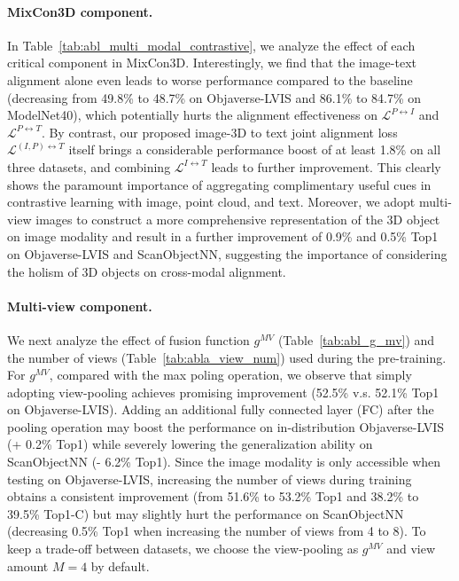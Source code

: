 \documentclass{article} \usepackage{iclr2024_conference,times}
\newcommand{\ourmethod}{MixCon3D}
\begin{document}
\paragraph{MixCon3D component.}
In Table~\ref{tab:abl_multi_modal_contrastive}, we analyze the effect of each critical component in \ourmethod. 
Interestingly, we find that the image-text alignment alone even leads to worse performance compared to the baseline (decreasing from 49.8\% to 48.7\% on Objaverse-LVIS and 86.1\% to 84.7\% on ModelNet40), which potentially hurts the alignment effectiveness on $\mathcal{L}^{P \leftrightarrow I}$ and $\mathcal{L}^{P \leftrightarrow T}$.  
By contrast, our proposed image-3D to text joint alignment loss $\mathcal{L}^{(I,P) \leftrightarrow T}$ itself brings a considerable performance boost of at least 1.8\% on all three datasets, and combining $\mathcal{L}^{I \leftrightarrow T}$ leads to further improvement. 
This clearly shows the paramount importance of aggregating complimentary useful cues in contrastive learning with image, point cloud, and text. 
Moreover, we adopt multi-view images to construct a more comprehensive representation of the 3D object on image modality and result in a further improvement of 0.9\% and 0.5\% Top1 on Objaverse-LVIS and ScanObjectNN, suggesting the importance of considering the holism of 3D objects on cross-modal alignment.

\paragraph{Multi-view component.}
We next analyze the effect of fusion function $g^{MV}$ (Table~\ref{tab:abl_g_mv}) and the number of views (Table~\ref{tab:abla_view_num}) used during the pre-training.
For $g^{MV}$, compared with the max poling operation, we observe that simply adopting view-pooling achieves promising improvement (52.5\% v.s. 52.1\% Top1 on Objaverse-LVIS). 
Adding an additional fully connected layer (FC) after the pooling operation may boost the performance on in-distribution Objaverse-LVIS (+ 0.2\% Top1) while severely lowering the generalization ability on ScanObjectNN (- 6.2\% Top1). 
Since the image modality is only accessible when testing on Objaverse-LVIS, increasing the number of views during training obtains a consistent improvement (from 51.6\% to 53.2\% Top1 and 38.2\% to 39.5\% Top1-C) but may slightly hurt the performance on ScanObjectNN (decreasing 0.5\% Top1 when increasing the number of views from 4 to 8).
To keep a trade-off between datasets, we choose the view-pooling as $g^{MV}$ and view amount $M=4$ by default.
\end{document}
